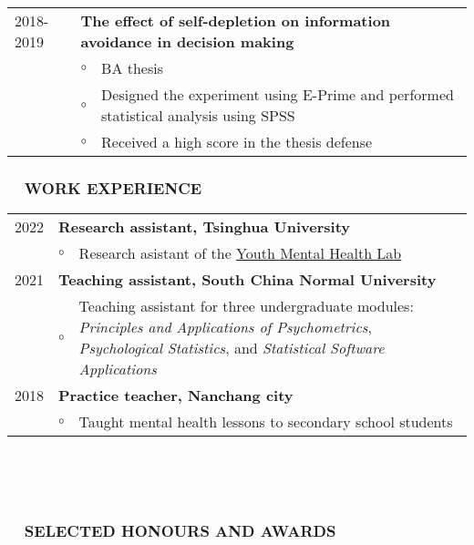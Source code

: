 \documentclass[a4paper, 12pt]{article}
\begin{document}
\begin{tabularx}{\textwidth}{p{2cm} p{0.1cm} X}
    2018-2019 & \multicolumn{2}{X}{\textbf{The effect of self-depletion on information avoidance in decision making}} \\
    & $\circ$ & BA thesis \\
    & $\circ$ & Designed the experiment using E-Prime and performed statistical analysis using SPSS \\
    & $\circ$ & Received a high score in the thesis defense \\

    \end{tabularx}

\subsubsection*{ \ \ WORK EXPERIENCE}

\begin{tabularx}{\textwidth}{p{2cm} p{0.1cm} X}

    2022 & \multicolumn{2}{X}{\textbf{Research assistant, Tsinghua University}} \\
    & $ \circ $ & Research asistant of the \href{https://www.ymhlab.com}{Youth Mental Health Lab} \\

    2021 & \multicolumn{2}{X}{\textbf{Teaching assistant, South China Normal University}} \\
    & $ \circ $ & Teaching assistant for three undergraduate modules: \textit{Principles and Applications of Psychometrics}, \textit{Psychological Statistics}, and \textit{Statistical Software Applications} \\

    2018 & \multicolumn{2}{X}{\textbf{Practice teacher, Nanchang city}} \\
    & $ \circ $ & Taught mental health lessons to secondary school students

    \end{tabularx}

\  \par 
\  \par 



\subsubsection*{ \ \ SELECTED HONOURS AND AWARDS}
\end{document}
